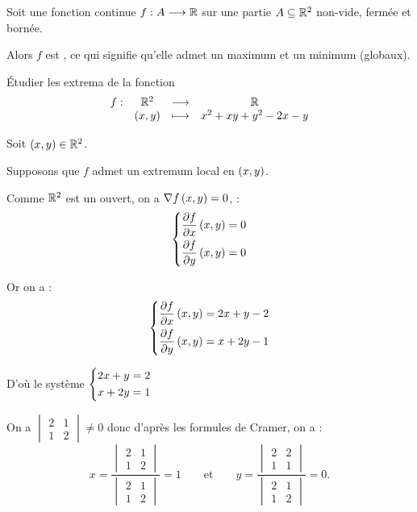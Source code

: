 \begin{theo}
Soit une fonction continue \(f:A\longrightarrow\mathbb{R}\) sur une partie \(A\subseteq\mathbb{R}^2\) non-vide, fermée et bornée.

Alors \(f\) est , ce qui signifie qu'elle admet un maximum et un minimum (globaux).
\end{theo}

\begin{exo}[Exercice 8]
Étudier les extrema de la fonction \[\begin{array}[t]{cccc}f : & \mathbb{R}^2 & \longrightarrow & \mathbb{R} \\ & \left(x,y\right) & \longmapsto & x^2+xy+y^2-2x-y\end{array}\]
\end{exo}

\begin{corr}
\analyse

Soit \(\left(x,y\right)\in\mathbb{R}^2\).

Supposons que \(f\) admet un extremum local en \(\left(x,y\right)\).

Comme \(\mathbb{R}^2\) est un ouvert, on a \(\nabla f\left(x,y\right)=0\), \cad : \[\begin{dcases}
\pdv{f}{x}\left(x,y\right)=0 \\
\pdv{f}{y}\left(x,y\right)=0
\end{dcases}\]

Or on a : \[\begin{dcases}
\pdv{f}{x}\left(x,y\right)=2x+y-2 \\
\pdv{f}{y}\left(x,y\right)=x+2y-1
\end{dcases}\]

D'où le système \(\begin{dcases}
2x+y=2 \\
x+2y=1
\end{dcases}\)

On a \(\begin{vmatrix}
2 & 1 \\
1 & 2
\end{vmatrix}\not=0\) donc d'après les formules de Cramer, on a : \[x=\dfrac{\begin{vmatrix}2 & 1 \\ 1 & 2\end{vmatrix}}{\begin{vmatrix}2 & 1 \\ 1 & 2\end{vmatrix}}=1\qquad\text{et}\qquad y=\dfrac{\begin{vmatrix}2 & 2 \\ 1 & 1\end{vmatrix}}{\begin{vmatrix}2 & 1 \\ 1 & 2\end{vmatrix}}=0.\]


\end{corr}
